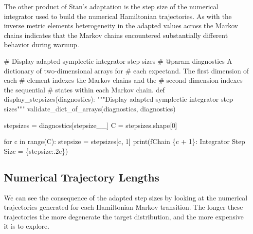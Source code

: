 \documentclass[
  letterpaper,
  DIV=11,
  numbers=noendperiod]{scrartcl}
\newenvironment{Shaded}{\begin{snugshade}}{\end{snugshade}}
\newcommand{\BuiltInTok}[1]{\textcolor[rgb]{0.00,0.23,0.31}{#1}}
\newcommand{\CommentTok}[1]{\textcolor[rgb]{0.37,0.37,0.37}{#1}}
\newcommand{\ControlFlowTok}[1]{\textcolor[rgb]{0.00,0.23,0.31}{#1}}
\newcommand{\DecValTok}[1]{\textcolor[rgb]{0.68,0.00,0.00}{#1}}
\newcommand{\KeywordTok}[1]{\textcolor[rgb]{0.00,0.23,0.31}{#1}}
\newcommand{\NormalTok}[1]{\textcolor[rgb]{0.00,0.23,0.31}{#1}}
\newcommand{\OperatorTok}[1]{\textcolor[rgb]{0.37,0.37,0.37}{#1}}
\newcommand{\SpecialCharTok}[1]{\textcolor[rgb]{0.37,0.37,0.37}{#1}}
\newcommand{\SpecialStringTok}[1]{\textcolor[rgb]{0.13,0.47,0.30}{#1}}
\newcommand{\StringTok}[1]{\textcolor[rgb]{0.13,0.47,0.30}{#1}}
\begin{document}
The other product of Stan's adaptation is the step size of the numerical
integrator used to build the numerical Hamiltonian trajectories. As with
the inverse metric elements heterogeneity in the adapted values across
the Markov chains indicates that the Markov chains encountered
substantially different behavior during warmup.

\begin{Shaded}
\begin{Highlighting}[]
\CommentTok{\# Display adapted symplectic integrator step sizes}
\CommentTok{\# @param diagnostics A dictionary of two{-}dimensional arrays for}
\CommentTok{\#                    each expectand.  The first dimension of each}
\CommentTok{\#                    element indexes the Markov chains and the}
\CommentTok{\#                    second dimension indexes the sequential}
\CommentTok{\#                    states within each Markov chain.}
\KeywordTok{def}\NormalTok{ display\_stepsizes(diagnostics):}
  \CommentTok{"""Display adapted symplectic integrator step sizes"""}
\NormalTok{  validate\_dict\_of\_arrays(diagnostics, }\StringTok{\textquotesingle{}diagnostics\textquotesingle{}}\NormalTok{)}

\NormalTok{  stepsizes }\OperatorTok{=}\NormalTok{ diagnostics[}\StringTok{\textquotesingle{}stepsize\_\_\textquotesingle{}}\NormalTok{]}
\NormalTok{  C }\OperatorTok{=}\NormalTok{ stepsizes.shape[}\DecValTok{0}\NormalTok{]}
  
  \ControlFlowTok{for}\NormalTok{ c }\KeywordTok{in} \BuiltInTok{range}\NormalTok{(C):}
\NormalTok{    stepsize }\OperatorTok{=}\NormalTok{ stepsizes[c, }\DecValTok{1}\NormalTok{]}
    \BuiltInTok{print}\NormalTok{(}\SpecialStringTok{f\textquotesingle{}Chain }\SpecialCharTok{\{}\NormalTok{c }\OperatorTok{+} \DecValTok{1}\SpecialCharTok{\}}\SpecialStringTok{: Integrator Step Size = }\SpecialCharTok{\{}\NormalTok{stepsize}\SpecialCharTok{:.2e\}}\SpecialStringTok{\textquotesingle{}}\NormalTok{)}
\end{Highlighting}
\end{Shaded}

\subsection{Numerical Trajectory
Lengths}\label{numerical-trajectory-lengths}

We can see the consequence of the adapted step sizes by looking at the
numerical trajectories generated for each Hamiltonian Markov transition.
The longer these trajectories the more degenerate the target
distribution, and the more expensive it is to explore.
\end{document}
